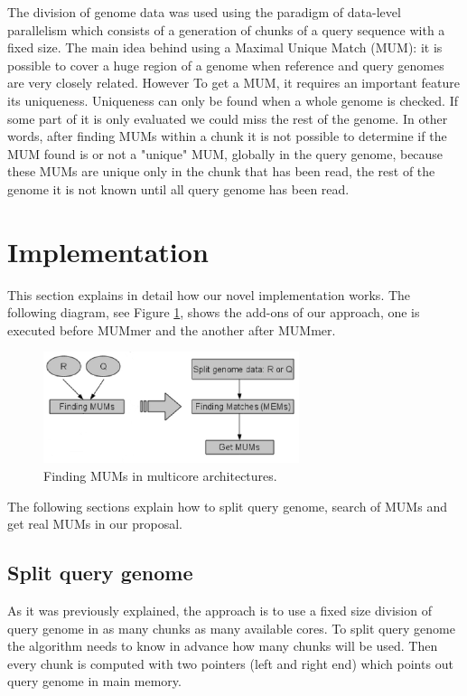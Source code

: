 \documentclass[3p,times]{elsarticle}
\begin{document}
The division of genome data was used using the paradigm of data-level parallelism which consists of a generation of chunks of a query sequence with a fixed size. 
The main idea behind using a Maximal Unique Match (MUM): it is possible to cover a huge region of a genome when reference and query genomes are very closely related. However 
To get a MUM, it requires an important feature its uniqueness. 
Uniqueness can only be found when a whole genome is checked. If some part of it is only evaluated we could miss the rest of the genome. In other words, after finding MUMs within a chunk it is not possible to determine if the MUM found is or not a "unique" MUM, globally in the query genome,  because these MUMs are unique only in the chunk that has been read, the rest of the genome it is not known until all query genome has been read.\\
\section{Implementation} 
\label{implementation}
This section explains in detail how our novel implementation works. The following diagram, see Figure \ref{xipe-totec}, shows the add-ons of our approach, one is executed before MUMmer and the another after MUMmer.
\begin{figure}[htb]   
 \begin{center} 
   \includegraphics[width=7.5cm]{toci.png}
 \end{center}
 \caption{Finding MUMs in multicore architectures.} 
 \label{xipe-totec} 
\end{figure}
The following sections explain how to split query genome, search of MUMs and get real MUMs in our proposal.
\subsection*{Split query genome}  
As it was previously explained, the approach is to use a fixed size division of query genome in as many chunks as  many available cores. 
To split query genome the algorithm needs to know in advance how many chunks will be used. Then every chunk is computed with two pointers (left and right end)
which points out query genome in main memory.
\end{document}
